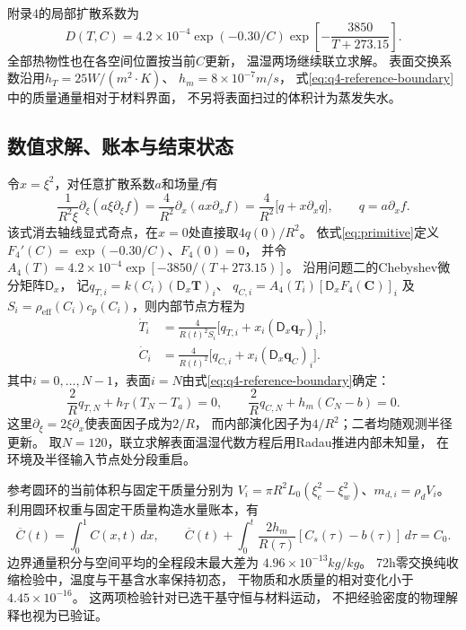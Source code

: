 附录4的局部扩散系数为
\begin{equation}
 D(T,C)=4.2\times10^{-4}
 \exp(-0.30/C)
 \exp\!\left[-\frac{3850}{T+273.15}\right].
 \label{eq:q4-diffusivity}
\end{equation}
全部热物性也在各空间位置按当前$C$更新，
温湿两场继续联立求解。
表面交换系数沿用$h_T=25\unit{W/(m^2\cdot K)}$、
$h_m=8\times10^{-7}\unit{m/s}$，
式\eqref{eq:q4-reference-boundary}中的质量通量相对于材料界面，
不另将表面扫过的体积计为蒸发失水。

\subsection{数值求解、账本与结束状态}

令$x=\xi^2$，对任意扩散系数$a$和场量$f$有
\begin{equation}
 \frac{1}{R^2\xi}\partial_\xi(a\xi\partial_\xi f)
 =\frac4{R^2}\partial_x(ax\partial_x f)
 =\frac4{R^2}\bigl[q+x\partial_xq\bigr],
 \qquad q=a\partial_xf.
 \label{eq:q4-x-operator}
\end{equation}
该式消去轴线显式奇点，在$x=0$处直接取$4q(0)/R^2$。
依式\eqref{eq:primitive}定义$F_4'(C)=\exp(-0.30/C)$、$F_4(0)=0$，
并令$A_4(T)=4.2\times10^{-4}\exp[-3850/(T+273.15)]$。
沿用问题二的Chebyshev微分矩阵$\mathsf D_x$，
记$q_{T,i}=k(C_i)(\mathsf D_x\boldsymbol T)_i$、
$q_{C,i}=A_4(T_i)[\mathsf D_x F_4(\boldsymbol C)]_i$
及$S_i=\rho_{\mathrm{eff}}(C_i)c_p(C_i)$，则内部节点方程为
\begin{equation}
 \begin{aligned}
  \dot T_i&=\frac4{R(t)^2S_i}
       \bigl[q_{T,i}+x_i(\mathsf D_x\boldsymbol q_T)_i\bigr],\\
  \dot C_i&=\frac4{R(t)^2}
       \bigl[q_{C,i}+x_i(\mathsf D_x\boldsymbol q_C)_i\bigr].
 \end{aligned}
 \label{eq:q4-semidiscrete}
\end{equation}
其中$i=0,\ldots,N-1$，表面$i=N$由式\eqref{eq:q4-reference-boundary}确定：
\begin{equation}
 \frac2R q_{T,N}+h_T(T_N-T_a)=0,
 \qquad
 \frac2R q_{C,N}+h_m(C_N-b)=0.
 \label{eq:q4-discrete-robin}
\end{equation}
这里$\partial_\xi=2\xi\partial_x$使表面因子成为$2/R$，
而内部演化因子为$4/R^2$；二者均随观测半径更新。
取$N=120$，联立求解表面温湿代数方程后用Radau推进内部未知量，
在环境及半径输入节点处分段重启。

参考圆环的当前体积与固定干质量分别为
$V_i=\pi R^2L_0(\xi_e^2-\xi_w^2)$、$m_{d,i}=\rho_d V_i$。
利用圆环权重与固定干质量构造水量账本\cite{dasilva2014}，有
\begin{equation}
 \overline C(t)=\int_0^1C(x,t)\,dx,
 \qquad
 \overline C(t)+\int_0^t\frac{2h_m}{R(\tau)}
       [C_s(\tau)-b(\tau)]\,d\tau=C_0.
 \label{eq:q4-water-ledger}
\end{equation}
边界通量积分与空间平均的全程段末最大差为
$4.96\times10^{-13}\unit{kg/kg}$。
72\unit{h}零交换纯收缩检验中，温度与干基含水率保持初态，
干物质和水质量的相对变化小于$4.45\times10^{-16}$。
这两项检验针对已选干基守恒与材料运动，
不把经验密度的物理解释也视为已验证。

